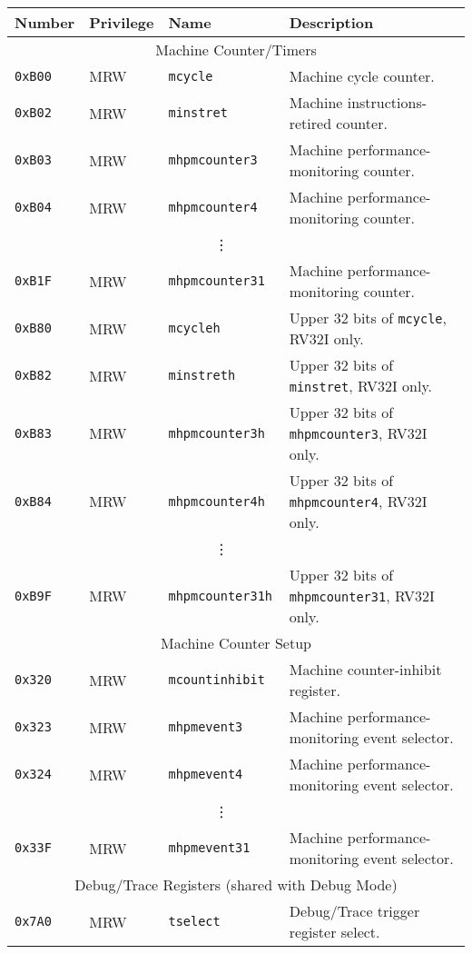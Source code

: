 \begin{table}[htb!]
\begin{center}
\begin{tabular}{|l|l|l|l|}
\hline
Number    & Privilege & Name & Description \\
\hline
\multicolumn{4}{|c|}{Machine Counter/Timers} \\
\hline
\tt 0xB00 & MRW  &\tt mcycle         & Machine cycle counter. \\
\tt 0xB02 & MRW  &\tt minstret       & Machine instructions-retired counter. \\
\tt 0xB03 & MRW  &\tt mhpmcounter3   & Machine performance-monitoring counter. \\
\tt 0xB04 & MRW  &\tt mhpmcounter4   & Machine performance-monitoring counter. \\
& & \multicolumn{1}{c|}{\vdots} & \ \\
\tt 0xB1F & MRW  &\tt mhpmcounter31  & Machine performance-monitoring counter. \\
\tt 0xB80 & MRW  &\tt mcycleh        & Upper 32 bits of {\tt mcycle}, RV32I only. \\
\tt 0xB82 & MRW  &\tt minstreth      & Upper 32 bits of {\tt minstret}, RV32I only. \\
\tt 0xB83 & MRW  &\tt mhpmcounter3h  & Upper 32 bits of {\tt mhpmcounter3}, RV32I only. \\
\tt 0xB84 & MRW  &\tt mhpmcounter4h  & Upper 32 bits of {\tt mhpmcounter4}, RV32I only. \\
& & \multicolumn{1}{c|}{\vdots} & \ \\
\tt 0xB9F & MRW  &\tt mhpmcounter31h & Upper 32 bits of {\tt mhpmcounter31}, RV32I only. \\
\hline  
\multicolumn{4}{|c|}{Machine Counter Setup} \\
\hline
\tt 0x320 & MRW  &\tt mcountinhibit  & Machine counter-inhibit register. \\
\tt 0x323 & MRW  &\tt mhpmevent3     & Machine performance-monitoring event selector. \\
\tt 0x324 & MRW  &\tt mhpmevent4     & Machine performance-monitoring event selector. \\
& & \multicolumn{1}{c|}{\vdots} & \ \\
\tt 0x33F & MRW  &\tt mhpmevent31    & Machine performance-monitoring event selector. \\
\hline
\multicolumn{4}{|c|}{Debug/Trace Registers (shared with Debug Mode)} \\
\hline
\tt 0x7A0 & MRW &\tt tselect & Debug/Trace trigger register select. \\

\end{tabular}
\end{center}
\end{table}
